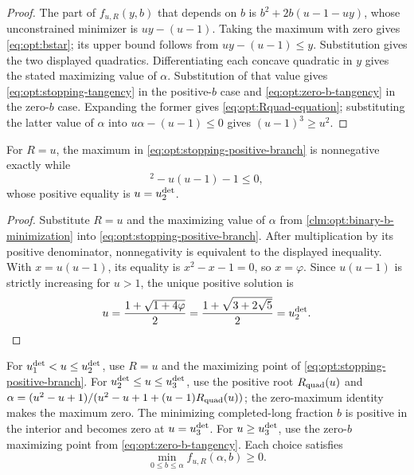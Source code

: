 \begin{proof}
The part of $f_{u,R}(y,b)$ that depends on $b$ is
$b^2+2b(u-1-uy)$, whose unconstrained minimizer is
$uy-(u-1)$.  Taking the maximum with zero gives
\cref{eq:opt:bstar}; its upper bound follows from
$uy-(u-1)\le y$.  Substitution gives the two displayed quadratics.
Differentiating each concave quadratic in $y$ gives the stated maximizing
value of $\alpha$.  Substitution of that value gives
\cref{eq:opt:stopping-tangency} in the positive-$b$ case and
\cref{eq:opt:zero-b-tangency} in the zero-$b$ case.  Expanding the former
gives \cref{eq:opt:Rquad-equation}; substituting the latter value of
$\alpha$ into $u\alpha-(u-1)\le0$ gives $(u-1)^3\ge u^2$.
\end{proof}

\begin{claim}
\label{clm:opt:binary-first-transition}
For $R=u$, the maximum in
\cref{eq:opt:stopping-positive-branch} is nonnegative exactly while
\begin{equation}
 [u(u-1)]^2-u(u-1)-1\le0,
\end{equation}
whose positive equality is $u=u_{2}^{\mathrm{det}}$.
\end{claim}

\begin{proof}
Substitute $R=u$ and the maximizing value of $\alpha$ from
\cref{clm:opt:binary-b-minimization} into
\cref{eq:opt:stopping-positive-branch}.  After multiplication by its
positive denominator, nonnegativity is equivalent to the displayed
inequality.  With $x=u(u-1)$, its equality is $x^2-x-1=0$, so
$x=\varphi$.  Since $u(u-1)$ is strictly increasing for $u>1$, the unique
positive solution is
\[
 u=\frac{1+\sqrt{1+4\varphi}}2
  =\frac{1+\sqrt{3+2\sqrt5}}2=u_{2}^{\mathrm{det}}.
\]
\end{proof}

\begin{claim}
\label{clm:opt:binary-stopping-choices}
For $u_{1}^{\mathrm{det}}<u\le u_{2}^{\mathrm{det}}$, use $R=u$ and the maximizing point of
\cref{eq:opt:stopping-positive-branch}.  For
$u_{2}^{\mathrm{det}}\le u\le u_{3}^{\mathrm{det}}$, use the positive root $R_{\mathrm{quad}}(u)$ and
$\alpha=(u^2-u+1)/(u^2-u+1+(u-1)R_{\mathrm{quad}}(u))$; the zero-maximum identity makes the
maximum zero.  The minimizing completed-long fraction $b$ is positive in the
interior and becomes zero
at $u=u_{3}^{\mathrm{det}}$.  For $u\ge u_{3}^{\mathrm{det}}$, use the zero-$b$ maximizing point from
\cref{eq:opt:zero-b-tangency}.  Each choice satisfies
\[
 \min_{0\le b\le\alpha} f_{u,R}(\alpha,b)\ge0.
\]
\end{claim}

